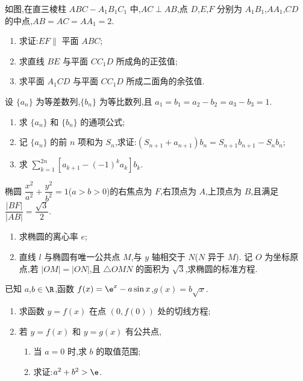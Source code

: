 \begin{problem}
如图,在直三棱柱 \(ABC-A_1B_1C_1\) 中,\(AC\perp AB\),点 \(D\),\(E\),\(F\) 分别为 \(A_1B_1\),\(AA_1\),\(CD\) 的中点,\(AB=AC=AA_1=2\).

\begin{enumerate}
\item 求证:\(EF\parallel\) 平面 \(ABC\);
\item 求直线 \(BE\) 与平面 \(CC_1D\) 所成角的正弦值;
\item 求平面 \(A_1CD\) 与平面 \(CC_1D\) 所成二面角的余弦值.
\end{enumerate}

\end{problem}

\begin{problem}
设 \(\{a_n\}\) 为等差数列,\(\{b_n\}\) 为等比数列,且 \(a_1=b_1=a_2-b_2=a_3-b_3=1\).

\begin{enumerate}
\item 求 \(\{a_n\}\) 和 \(\{b_n\}\) 的通项公式;
\item 记 \(\{a_n\}\) 的前 \(n\) 项和为 \(S_n\),求证:\(\left(S_{n+1}+a_{n+1}\right)b_n=S_{n+1}b_{n+1}-S_nb_n\);
\item 求 \(\displaystyle\sum_{k=1}^{2n}\left[a_{k+1}-(-1)^ka_k\right]b_k\).
\end{enumerate}
\end{problem}

\begin{problem}
椭圆 \(\dfrac{x^2}{a^2}+\dfrac{y^2}{b^2}=1\)(\(a>b>0\))的右焦点为 \(F\),右顶点为 \(A\),上顶点为 \(B\),且满足 \(\dfrac{|BF|}{|AB|}=\dfrac{\sqrt{3}}{2}\).

\begin{enumerate}
\item 求椭圆的离心率 \(e\);
\item 直线 \(l\) 与椭圆有唯一公共点 \(M\),与 \(y\) 轴相交于 \(N\)(\(N\) 异于 \(M\)). 记 \(O\) 为坐标原点,若 \(|OM|=|ON|\),且 \(\triangle OMN\) 的面积为 \(\sqrt{3}\),求椭圆的标准方程.
\end{enumerate}
\end{problem}

\begin{problem}
已知 \(a\),\(b\in\R\),函数 \(f(x)=\e^x-a\sin x\),\(g(x)=b\sqrt{x}\).

\begin{enumerate}
\item 求函数 \(y=f(x)\) 在点 \((0,f(0))\) 处的切线方程;
\item 若 \(y=f(x)\) 和 \(y=g(x)\) 有公共点,
\begin{enumerate}
\item 当 \(a=0\) 时,求 \(b\) 的取值范围;
\item 求证:\(a^2+b^2>\e\).
\end{enumerate}
\end{enumerate}
\end{problem}

